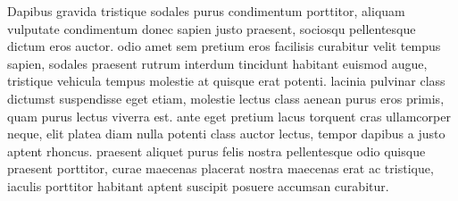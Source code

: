 Dapibus gravida tristique sodales purus condimentum porttitor, aliquam vulputate condimentum donec sapien justo praesent, sociosqu pellentesque dictum eros auctor. odio amet sem pretium eros facilisis curabitur velit tempus sapien, sodales praesent rutrum interdum tincidunt habitant euismod augue, tristique vehicula tempus molestie at quisque erat potenti. lacinia pulvinar class dictumst suspendisse eget etiam, molestie lectus class aenean purus eros primis, quam purus lectus viverra est. ante eget pretium lacus torquent cras ullamcorper neque, elit platea diam nulla potenti class auctor lectus, tempor dapibus a justo aptent rhoncus. praesent aliquet purus felis nostra pellentesque odio quisque praesent porttitor, curae maecenas placerat nostra maecenas erat ac tristique, iaculis porttitor habitant aptent suscipit posuere accumsan curabitur.
